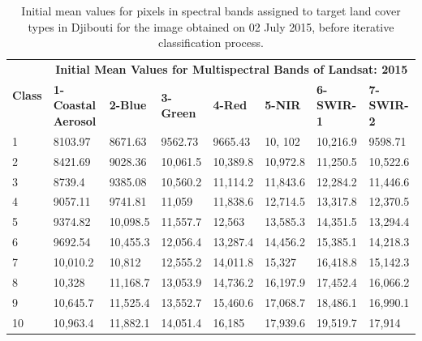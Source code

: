 \documentclass[jimaging,article,accept,pdftex,moreauthors]{Definitions/mdpi}
\begin{document}
\vspace{-6pt}
\begin{table}[H]\scriptsize
    \caption{Initial mean values for pixels in spectral bands assigned to target land cover types in Djibouti for the image obtained on 02 July 2015, before iterative classification process.}
  \begin{tabularx}{\textwidth}{p{0.7cm}p{2.5cm}p{1.0cm}p{1.3cm}p{1.0cm}p{1.0cm}p{1.5cm}p{1.5cm}}
  \toprule
  \multirow{2}{*}{\textbf{Class}} & \multicolumn{7}{c}{\textbf{Initial Mean Values for Multispectral Bands of Landsat:  2015}} \\
     & \textbf{1-Coastal Aerosol} & \textbf{2-Blue} & \textbf{3-Green} & \textbf{4-Red} & \textbf{5-NIR} & \textbf{6-SWIR-1} & \textbf{7-SWIR-2} \\
    \midrule
    1 & 8103.97 & 8671.63 & 9562.73 & 9665.43 & 10,%
102 & 10,216.9 & 9598.71 \\
    2 & 8421.69 & 9028.36 & 10,061.5 & 10,389.8 & 10,972.8 & 11,250.5 & 10,522.6 \\
    3 & 8739.4 & 9385.08 &10,560.2 & 11,114.2 & 11,843.6 & 12,284.2 & 11,446.6 \\
    4 & 9057.11 & 9741.81 & 11,059 & 11,838.6 & 12,714.5 & 13,317.8 & 12,370.5 \\
    5 & 9374.82 & 10,098.5 & 11,557.7 & 12,563 & 13,585.3 & 14,351.5 & 13,294.4 \\
    6 & 9692.54 & 10,455.3 & 12,056.4 & 13,287.4 & 14,456.2 & 15,385.1 & 14,218.3 \\
    7 & 10,010.2 & 10,812 & 12,555.2 & 14,011.8 & 15,327 & 16,418.8 & 15,142.3 \\
    8 & 10,328 & 11,168.7 & 13,053.9 & 14,736.2 & 16,197.9 & 17,452.4 & 16,066.2 \\
    9 & 10,645.7 & 11,525.4 & 13,552.7 & 15,460.6 & 17,068.7 & 18,486.1 & 16,990.1 \\
    10 & 10,963.4 & 11,882.1 & 14,051.4 & 16,185 & 17,939.6 & 19,519.7 & 17,914 \\
\bottomrule
\end{tabularx}

  \label{tabA1} 
\end{table} 
\end{document}
